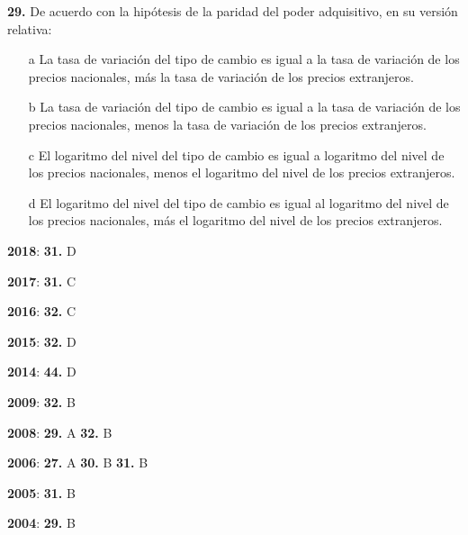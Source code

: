 \documentclass{nuevotema}
\begin{document}

\textbf{29.} De acuerdo con la hipótesis de la paridad del poder adquisitivo, en su versión relativa:
\begin{enumerate}
	\item[a] La tasa de variación del tipo de cambio es igual a la tasa de variación de los precios nacionales, más la tasa de variación de los precios extranjeros. 
	\item[b] La tasa de variación del tipo de cambio es igual a la tasa de variación de los precios nacionales, menos la tasa de variación de los precios extranjeros.
	\item[c] El logaritmo del nivel del tipo de cambio es igual a logaritmo del nivel de los precios nacionales, menos el logaritmo del nivel de los precios extranjeros.
	\item[d] El logaritmo del nivel del tipo de cambio es igual al logaritmo del nivel de los precios nacionales, más el logaritmo del nivel de los precios extranjeros. 
\end{enumerate}

\notas

\textbf{2018}: \textbf{31.} D

\textbf{2017}: \textbf{31.} C

\textbf{2016}: \textbf{32.} C

\textbf{2015}: \textbf{32.} D

\textbf{2014}: \textbf{44.} D

\textbf{2009}: \textbf{32.} B

\textbf{2008}: \textbf{29.} A \textbf{32.} B

\textbf{2006}: \textbf{27.} A \textbf{30.} B \textbf{31.} B

\textbf{2005}: \textbf{31.} B

\textbf{2004}: \textbf{29.} B

\bibliografia
 
\end{document}
